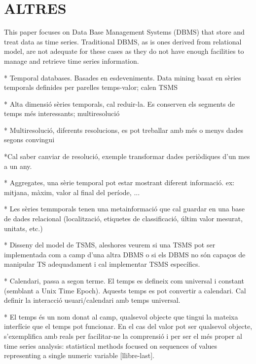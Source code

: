 \documentclass{acm_proc_article-sp}
\begin{document}












\section{ALTRES}


This paper focuses on Data Base Management Systems (DBMS) that store
and treat data as time series. Traditional DBMS, as is ones derived
from relational model, are not adequate for these cases as they do not
have enough facilities to manage and retrieve time series
information.



* Temporal databases. Basades en esdeveniments. Data mining basat en sèries temporals definides per parelles temps-valor; calen TSMS

* Alta dimensió sèries temporals, cal reduir-la. Es conserven els segments de temps més interessants; multiresolució

* Multiresolució, diferents resolucions, es pot treballar amb més o menys dades segons convingui

*Cal saber canviar de resolució, exemple transformar dades periòdiques d'un mes a un any.

* Aggregates, una sèrie temporal pot estar mostrant diferent informació. ex: mitjana, màxim, valor al final del període, ...

* Les sèries temmporals tenen una metainformació que cal guardar en una base de dades relacional (localització, etiquetes de classificació, últim valor mesurat, unitats, etc.)

* Disseny del model de TSMS, aleshores veurem si una TSMS pot ser implementada com a camp d'una altra DBMS o si els DBMS no són capaços de manipular TS adequadament i cal implementar TSMS específics.

* Calendari, passa a segon terme. El temps es defineix com universal i constant (semblant a Unix Time Epoch). Aquests temps es pot convertir a calendari. Cal definir la interacció usuari/calendari amb temps universal.

* El temps és un nom donat al camp, qualsevol objecte que tingui la mateixa interfície que el temps pot funcionar. En el cas del valor pot ser qualsevol objecte, s'exemplifica amb reals per facilitar-ne la comprensió i per ser el més proper al time series analysis: statistical methods focused on sequences of values representing a single numeric variable [llibre-last].
\end{document}
